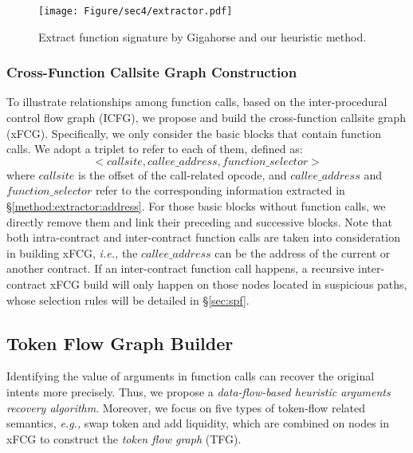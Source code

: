 \begin{figure}[t] 
\centering
\texttt{[image: Figure/sec4/extractor.pdf]} 
\vspace{-0.2in}
\caption{Extract function signature by Gigahorse and our heuristic method.} 
\vspace{-0.1in}
\label{fig:selector} 
\end{figure}


\subsubsection{Cross-Function Callsite Graph Construction}
\label{method:xcsg}
To illustrate relationships among function calls, based on the inter-procedural control flow graph (ICFG), we propose and build the cross-function callsite graph (xFCG).
Specifically, we only consider the basic blocks that contain function calls. We adopt a triplet to refer to each of them, defined as:
$$<callsite,callee\_address,function\_selector>$$
where $callsite$ is the offset of the call-related opcode, and $callee\_address$ and $function\_selector$ refer to the corresponding information extracted in \S\ref{method:extractor:address}.
For those basic blocks without function calls, we directly remove them and link their preceding and successive blocks.
Note that both intra-contract and inter-contract function calls are taken into consideration in building xFCG, \textit{i.e.,} the $callee\_address$ can be the address of the current or another contract.
If an inter-contract function call happens, a recursive inter-contract xFCG build will only happen on those nodes located in suspicious paths, whose selection rules will be detailed in \S\ref{sec:spf}.


\subsection{Token Flow Graph Builder}
\label{sec:tfg_g}
Identifying the value of arguments in function calls can recover the original intents more precisely. Thus, we propose a \textit{data-flow-based heuristic arguments recovery algorithm}.
Moreover, we focus on five types of token-flow related semantics, \textit{e.g.,} swap token and add liquidity, which are combined on nodes in xFCG to construct the \textit{token flow graph} (TFG).


